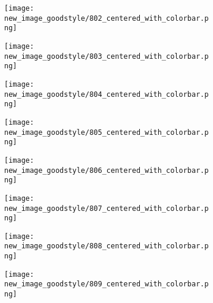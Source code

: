 \documentclass[a4paper,12pt]{article}
\begin{document}
\begin{figure}[H]
  \begin{subfigure}{0.11\textwidth}
    \texttt{[image: new\_image\_goodstyle/802\_centered\_with\_colorbar.png]}
  \end{subfigure}
  \hfill
  \begin{subfigure}{0.11\textwidth}
    \texttt{[image: new\_image\_goodstyle/803\_centered\_with\_colorbar.png]}
  \end{subfigure}
  \hfill
  \begin{subfigure}{0.11\textwidth}
    \texttt{[image: new\_image\_goodstyle/804\_centered\_with\_colorbar.png]}
  \end{subfigure}
  \hfill
  \begin{subfigure}{0.11\textwidth}
    \texttt{[image: new\_image\_goodstyle/805\_centered\_with\_colorbar.png]}
  \end{subfigure}
  \hfill
  \begin{subfigure}{0.11\textwidth}
    \texttt{[image: new\_image\_goodstyle/806\_centered\_with\_colorbar.png]}
  \end{subfigure}
  \hfill
  \begin{subfigure}{0.11\textwidth}
    \texttt{[image: new\_image\_goodstyle/807\_centered\_with\_colorbar.png]}
  \end{subfigure}
  \hfill
  \begin{subfigure}{0.11\textwidth}
    \texttt{[image: new\_image\_goodstyle/808\_centered\_with\_colorbar.png]}
  \end{subfigure}
  \hfill
  \begin{subfigure}{0.11\textwidth}
    \texttt{[image: new\_image\_goodstyle/809\_centered\_with\_colorbar.png]}
  \end{subfigure}
  \hfill
\end{figure}
\end{document}
